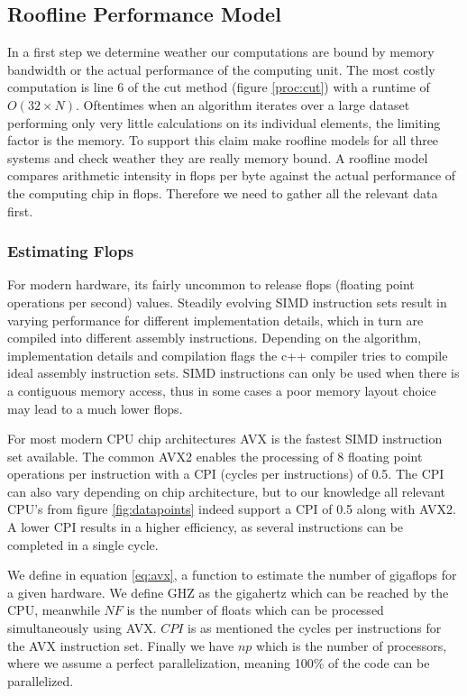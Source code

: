 \documentclass[]{article}
\begin{document}
\subsection{Roofline Performance Model} \label{sec:roof}

In a first step we determine weather our computations are bound by memory bandwidth or the actual performance of the computing unit. The most costly computation is line 6 of the cut method (figure \ref{proc:cut}) with a runtime of $O(32 \times N)$. Oftentimes when an algorithm iterates over a large dataset performing only very little calculations on its individual elements, the limiting factor is the memory. To support this claim make roofline models for all three systems and check weather they are really memory bound. A roofline model compares arithmetic intensity in flops per byte against the actual performance of the computing chip in flops. Therefore we need to gather all the relevant data first.

\subsubsection{Estimating Flops}

For modern hardware, its fairly uncommon to release flops (floating point operations per second) values. Steadily evolving SIMD instruction sets result in varying performance for different implementation details, which in turn are compiled into different assembly instructions. Depending on the algorithm, implementation details and compilation flags the c++ compiler tries to compile ideal assembly instruction sets. SIMD instructions can only be used when there is a contiguous memory access, thus in some cases a poor memory layout choice may lead to a much lower flops. 

For most modern CPU chip architectures AVX is the fastest SIMD instruction set available. The common AVX2 enables the processing of 8 floating point operations per instruction with a  CPI (cycles per instructions) of 0.5. The CPI can also vary depending on chip architecture, but to our knowledge all relevant CPU's from figure \ref{fig:datapoints} indeed support a CPI of 0.5 along with AVX2. A lower CPI results in a higher efficiency, as several instructions can be completed in a single cycle. 

We define in equation \ref{eq:avx}, a function to estimate the number of gigaflops for a given hardware. We define GHZ as the gigahertz which can be reached by the CPU, meanwhile $NF$ is the number of floats which can be processed simultaneously using AVX. $CPI$ is as mentioned the cycles per instructions for the AVX instruction set. Finally we have $np$ which is the number of processors, where we assume a perfect parallelization, meaning 100\% of the code can be parallelized.
\end{document}
